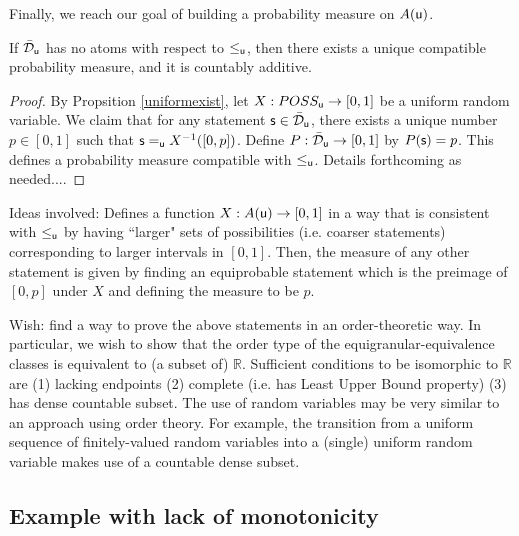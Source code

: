 \documentclass[11pt]{article}
\begin{document}
Finally, we reach our goal of building a probability measure on $A(\stmt[u])$. 

\begin{prop}
If $\tdomain_{\stmt[u]}$ has no atoms with respect to $\lequ$, then there exists a unique compatible probability measure, and it is countably additive. 
\end{prop}
\begin{proof}
By Propsition \ref{uniformexist}, let $X:POSS_{\stmt[u]}\to[0,1]$ be a uniform random variable.
We claim that for any statement $\stmt\in\tdomain_{\stmt[u]}$, there exists a unique number $p\in[0,1]$ such that $\stmt\equ X^{-1}([0,p])$. Define $P:\tdomain_{\stmt[u]}\to[0,1]$ by $P(\stmt)= p$. This defines a probability measure compatible with $\lequ$. Details forthcoming as needed....
\end{proof}

Ideas involved: Defines a function $X:A(\stmt[u])\to [0,1]$ in a way that is consistent with $\lequ$ by having ``larger" sets of possibilities (i.e. coarser statements) corresponding to larger intervals in $[0,1]$. Then, the measure of any other statement is given by finding an equiprobable statement which is the preimage of $[0,p]$ under $X$ and defining the measure to be $p$.  

Wish: find a way to prove the above statements in an order-theoretic way. In particular, we wish to show that the order type of the equigranular-equivalence classes is equivalent to (a subset of) $\mathbb{R}$. Sufficient conditions to be isomorphic to $\mathbb{R}$ are (1) lacking endpoints (2) complete (i.e. has Least Upper Bound property) (3) has dense countable subset. The use of random variables may be very similar to an approach using order theory. For example, the transition from a uniform sequence of finitely-valued random variables into a (single) uniform random variable makes use of a countable dense subset. 








\subsection{Example with lack of monotonicity}
\end{document}
